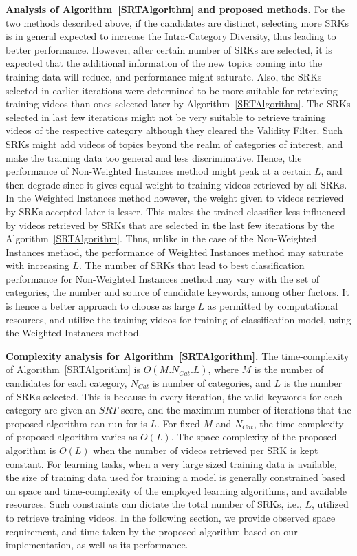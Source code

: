 \textbf{Analysis of Algorithm~\ref{SRTAlgorithm} and proposed methods.}
For the two methods described above, if the candidates are distinct, selecting more SRKs is in general expected to increase the Intra-Category Diversity, thus leading to better performance. However, after certain number of SRKs are selected, it is expected that the additional information of the new topics coming into the training data will reduce, and performance might saturate. Also, the SRKs selected in earlier iterations were determined to be more suitable for retrieving training videos than ones selected later by Algorithm~\ref{SRTAlgorithm}. The SRKs selected in last few iterations might not be very suitable to retrieve training videos of the respective category although they cleared the Validity Filter. Such SRKs might add videos of topics beyond the realm of categories of interest, and make the training data too general and less discriminative. Hence, the performance of Non-Weighted Instances method might peak at a certain $L$, and then degrade since it gives equal weight to training videos retrieved by all SRKs. In the Weighted Instances method however, the weight given to videos retrieved by SRKs accepted later is lesser. This makes the trained classifier less influenced by videos retrieved by SRKs that are selected in the last few iterations by the Algorithm~\ref{SRTAlgorithm}. Thus, unlike in the case of the Non-Weighted Instances method, the performance of Weighted Instances method may saturate with increasing $L$. The number of SRKs that lead to best classification performance for Non-Weighted Instances method may vary with the set of categories, the number and source of candidate keywords, among other factors. It is hence a better approach to choose as large $L$ as permitted by computational resources, and utilize the training videos for training of classification model, using the Weighted Instances method.

\textbf{Complexity analysis for Algorithm~\ref{SRTAlgorithm}.}
The time-complexity of Algorithm~\ref{SRTAlgorithm} is $O(M.N_{Cat}.L)$,  where $M$  is the number of candidates for each category, $N_{Cat}$ is number of categories, and $L$ is the number of SRKs selected. This is because in every iteration, the valid keywords for each category are given an $SRT$ score, and the maximum number of iterations that the proposed algorithm can run for is $L$. For fixed $M$ and $N_{Cat}$, the time-complexity of proposed algorithm varies as $O(L)$. The space-complexity of the proposed algorithm is $O(L)$ when the number of videos retrieved per SRK is kept constant. For learning tasks, when a very large sized training data is available, the size of training data used for training a model is generally constrained based on space and time-complexity of the employed learning algorithms, and available resources. Such constraints can dictate the total number of SRKs, i.e., $L$, utilized to retrieve training videos. In the following section, we provide observed space requirement, and time taken by the proposed algorithm based on our implementation, as well as its performance. 

